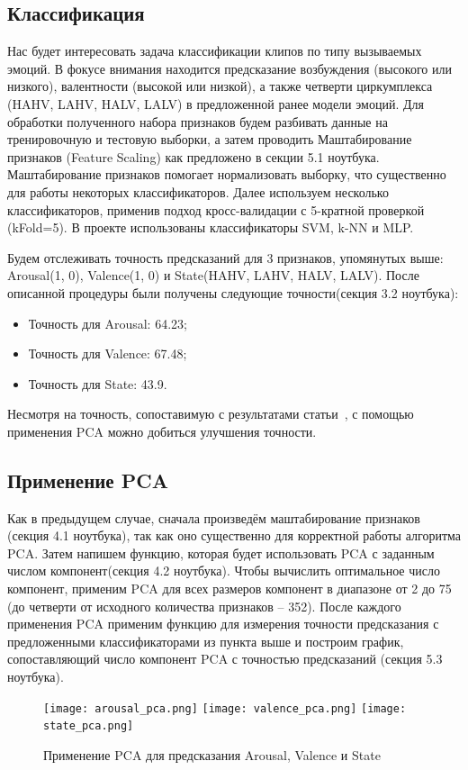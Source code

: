 \documentclass{article}
\begin{document}
\subsection{Классификация}
Нас будет интересовать задача классификации клипов по типу вызываемых эмоций. В фокусе внимания находится предсказание возбуждения (высокого или низкого), валентности (высокой или низкой), а также четверти циркумплекса (HAHV, LAHV, HALV, LALV) в предложенной ранее модели эмоций.
Для обработки полученного набора признаков будем разбивать данные на тренировочную и тестовую выборки, а затем проводить Маштабирование признаков (Feature Scaling) как предложено в секции 5.1 ноутбука. Маштабирование признаков помогает нормализовать выборку, что существенно для работы некоторых классификаторов. Далее используем несколько классификаторов, применив подход кросс-валидации с 5-кратной проверкой (kFold=5). В проекте использованы классификаторы SVM, k-NN и MLP.

Будем отслеживать точность предсказаний для 3 признаков, упомянутых выше: Arousal(1, 0), Valence(1, 0) и State(HAHV, LAHV, HALV, LALV).
После описанной процедуры были получены следующие точности(секция 3.2 ноутбука):
\begin{itemize}
\item Точность для Arousal: 64.23;
\item Точность для Valence: 67.48;
\item Точность для State: 43.9.
\end{itemize}
Несмотря на точность, сопоставимую с результатами статьи~\cite{Atkinson}, с помощью применения PCA можно добиться улучшения точности.

\subsection{Применение PCA}
Как в предыдущем случае, сначала произведём маштабирование признаков (секция 4.1 ноутбука), так как оно существенно для корректной работы алгоритма PCA. Затем напишем функцию, которая будет использовать PCA с заданным числом компонент(секция 4.2 ноутбука).
Чтобы вычислить оптимальное число компонент, применим PCA для всех размеров компонент в диапазоне от 2 до 75 (до четверти от исходного количества признаков -- 352).
После каждого применения PCA применим функцию для измерения точности предсказания с предложенными классификаторами из пункта выше и построим график, сопоставляющий число компонент PCA с точностью предсказаний (секция 5.3 ноутбука).

\begin{figure}[h!]
    \texttt{[image: arousal\_pca.png]}\hfill
    \texttt{[image: valence\_pca.png]}\hfill
    \texttt{[image: state\_pca.png]}
    \caption{Применение PCA для предсказания Arousal, Valence и State}
\end{figure}
    
\end{document}
